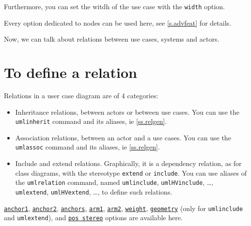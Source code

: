 \documentclass[a4paper,11pt]{report}
\begin{document}
Furthermore, you can set the witdh of the use case with the {\tt width} option.

\medskip

Every \TikZ{} option dedicated to nodes can be used here, see \autoref{s.advfeat} for details.

\medskip

Now, we can talk about relations between use cases, systems and actors.

\section{To define a relation}\label{s.userel}

Relations in a user case diagram are of 4 categories:

\begin{itemize}
\item Inheritance relations, between actors or between use cases. You can use the {\tt umlinherit} command and its aliases, ie \autoref{ss.relgen}.
\item Association relations, between an actor and a use cases. You can use the {\tt umlassoc} command and its aliases, ie \autoref{ss.relgen}.
\item Include and extend relations. Graphically, it is a dependency relation, as for class diagrams, with the stereotype {\tt extend} or {\tt include}. You can use aliases of the {\tt umlrelation} command, named 
{\tt umlinclude}, {\tt umlHVinclude}, \ldots, {\tt umlextend}, {\tt umlHVextend}, \ldots, to define such relations.
\end{itemize}

\hyperlink{anchor1}{{\tt anchor1}}, \hyperlink{anchor2}{{\tt anchor2}}, \hyperlink{anchors}{{\tt anchors}}, \hyperlink{arm1}{{\tt arm1}}, \hyperlink{arm2}{{\tt arm2}}, \hyperlink{weight}{{\tt weight}}, \hyperlink{geometry}{{\tt geometry}} (only for {\tt umlinclude} and {\tt umlextend}), and \hyperlink{posstereo}{{\tt pos stereo}} options are available here.

\medskip

\begin{minipage}{0.51\textwidth}

\end{minipage}
\begin{minipage}{0.49\textwidth}
\begin{center}
\end{center}
\end{minipage}
\end{document}
